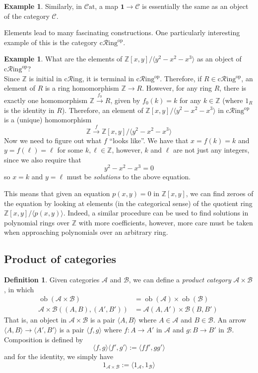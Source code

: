 \documentclass[10pt,oneside]{book}
\def\~#1{\mathscr{#1}}
\def\To#1{\xrightarrow{#1}}
\newcommand{\Z}{\mathbb{Z}}
\newcommand{\op}{\mathrm{op}}
\newcommand{\ob}{\mathop{\mathrm{ob}}}
\newcommand{\cRing}{\mathrm{c}\~{R}\mathrm{ing}}
\newcommand{\Cat}{\~C\mathrm{at}}
\theoremstyle{plain}
\theoremstyle{definition}
\newtheorem{defn}[thm]{Definition}
\newtheorem{ex}[thm]{Example}
\theoremstyle{remark}
\numberwithin{equation}{section}
\numberwithin{figure}{section}
\begin{document}
\begin{ex}
\label{ex:elements_in_cat}
    Similarly, in $\Cat$, a map $\mathbf{1} \to \~C$ is essentially the same as an object of the category $\~C$.
\end{ex}

Elements lead to many fascinating constructions. One particularly interesting example of this is the category $\cRing^\op$.

\begin{ex}
    What are the elements of $\Z[x, y] / \langle y^2 - x^2 - x^3 \rangle$ as an object of $\cRing^\op$? \\
    
    Since $\Z$ is initial in $\cRing$, it is terminal in $\cRing^\op$. Therefore, if $R \in \cRing^\op$, an element of $R$ is a ring homomorphism $\Z \to R$. However, for any ring $R$, there is exactly one homomorphism $\Z \To{f_0} R$, given by $f_0(k) = k$ for any $k \in \Z$ (where $1_R$ is the identity in $R$). Therefore, an element of $\Z[x, y] / \langle y^2 - x^2 - x^3 \rangle$ in $\cRing^{\op}$ is a (unique) homomorphism 
    \[\Z \To{f} \Z[x, y] / \langle y^2 - x^2 - x^3 \rangle\]
    Now we need to figure out what $f$ ``looks like''. We have that $x = f(k) = k$ and $y = f(\ell) = \ell$ for some $k, \ell \in \Z$, however, $k$ and $\ell$ are not just any integers, since we also require that 
    \[y^2 - x^2 - x^3 = 0\]
    so $x = k$ and $y = \ell$ must be \emph{solutions} to the above equation. 
    
    This means that given an equation $p(x, y) = 0$ in $\Z[x,y]$, we can find zeroes of the equation by looking at elements (in the categorical sense) of the quotient ring $\Z[x, y]/\langle p(x, y) \rangle$. Indeed, a similar procedure can be used to find solutions in polynomial rings over $\Z$ with more coefficients, however, more care must be taken when approaching polynomials over an arbitrary ring.
\end{ex}

\subsection*{Product of categories}

\begin{defn}
    Given categories $\~A$ and $\~B$, we can define  a \emph{product category} $\~A \times \~B$, in which 
    \begin{align*}
        \ob(\~A \times \~B) &= \ob(\~A) \times \ob(\~B) \\
        \~A \times \~B((A, B), (A', B')) &= \~A(A, A') \times \~B(B, B')\
    \end{align*}
    That is, an object in $\~A \times \~B$ is a pair $\langle A, B \rangle$ where $A \in \~A$ and $B \in \~B$. An arrow $\langle A, B\rangle \to \langle A', B' \rangle$ is a pair $\langle f, g \rangle$ where $f: A \to A'$ in $\~A$ and $g: B \to B'$ in $\~B$. Composition is defined by
    \[ \langle f, g \rangle  \langle f', g' \rangle := \langle f f', g g' \rangle\]
    and for the identity, we simply have
    \[1_{\~A \times \~B} := \langle 1_\~A, 1_\~B \rangle\]
\end{defn}
\end{document}
